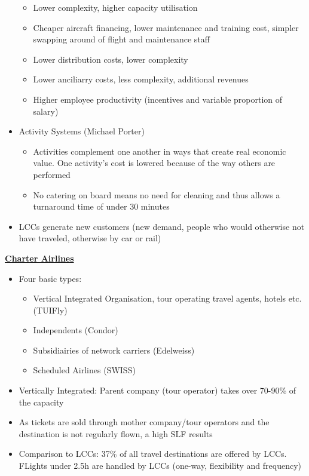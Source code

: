 \documentclass[9pt, landscape, fleqn]{scrartcl}
\begin{document}
\begin{multicols*}{3}
\begin{itemize}
\begin{itemize}
        \item Lower complexity, higher capacity utilisation 
        \item Cheaper aircraft financing, lower maintenance and training cost, simpler swapping around of flight and maintenance staff 
        \item Lower distribution costs, lower complexity 
        \item Lower anciliarry costs, less complexity, additional revenues 
        \item Higher employee productivity (incentives and variable proportion of salary)
    \end{itemize}
    \item Activity Systems (Michael Porter)
    \begin{itemize}
        \item Activities complement one another in ways that create real economic value. One activity's cost is lowered because of the way others are performed
        \item No catering on board means no need for cleaning and thus allows a turnaround time of under 30 minutes
    \end{itemize}
    \item LCCs generate new customers (new demand, people who would otherwise not have traveled, otherwise by car or rail)
\end{itemize}
\underline{\textbf{Charter Airlines}}
\begin{itemize}
    \item Four basic types: 
    \begin{itemize}
        \item Vertical Integrated Organisation, tour operating travel agents, hotels etc. (TUIFly)
        \item Independents (Condor)
        \item Subsidiairies of network carriers (Edelweiss)
        \item Scheduled Airlines (SWISS)
    \end{itemize}
    \item Vertically Integrated: Parent company (tour operator) takes over 70-90\% of the capacity 
    \item As tickets are sold through mother company/tour operators and the destination is not regularly flown, a high SLF results
    \item Comparison to LCCs: 37\% of all travel destinations are offered by LCCs. FLights under 2.5h are handled by LCCs (one-way, flexibility and frequency)

\end{itemize}
\end{multicols*}
\end{document}
